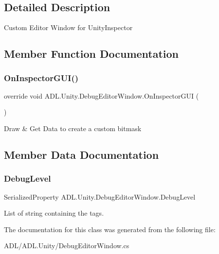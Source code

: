 \subsection{Detailed Description}
Custom Editor Window for Unity\+Inspector 



\subsection{Member Function Documentation}
\mbox{\label{class_a_d_l_1_1_unity_1_1_debug_editor_window_ab25bbc6b5b7b8260e76dbf9a781fa815}} 
\subsubsection{\texorpdfstring{On\+Inspector\+G\+U\+I()}{OnInspectorGUI()}}
{\footnotesize\ttfamily override void A\+D\+L.\+Unity.\+Debug\+Editor\+Window.\+On\+Inspector\+G\+UI (\begin{DoxyParamCaption}{ }\end{DoxyParamCaption})}



Draw \& Get Data to create a custom bitmask 



\subsection{Member Data Documentation}
\mbox{\label{class_a_d_l_1_1_unity_1_1_debug_editor_window_a2eee4bf996ebefb9635562de4614d81b}} 
\subsubsection{\texorpdfstring{Debug\+Level}{DebugLevel}}
{\footnotesize\ttfamily Serialized\+Property A\+D\+L.\+Unity.\+Debug\+Editor\+Window.\+Debug\+Level\hspace{0.3cm}{\ttfamily [private]}}



List of string containing the tags. 



The documentation for this class was generated from the following file\+:\begin{DoxyCompactItemize}
\item 
A\+D\+L/\+A\+D\+L.\+Unity/Debug\+Editor\+Window.\+cs\end{DoxyCompactItemize}
